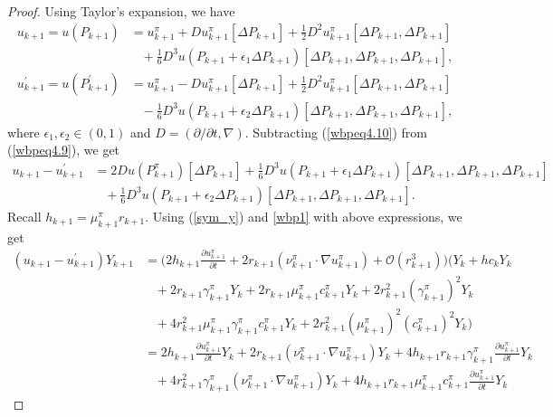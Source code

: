 \documentclass{article}
\theoremstyle{definition}
\numberwithin{equation}{section}
\begin{document}
\begin{proof}


 Using Taylor's expansion, we have
\begin{align}
    u_{k+1} = u(P_{k+1}) &= u^{\pi}_{k+1} + Du_{k+1}^{\pi}[\Delta P_{k+1}] + \frac{1}{2}D^{2}u_{k+1}^{\pi}[\Delta P_{k+1},\Delta P_{k+1} ] \nonumber \\ & \;\;\; +\frac{1}{6} D^{3}u(P_{k+1} + \epsilon_{1}\Delta P_{k+1})[\Delta P_{k+1},\Delta P_{k+1}, \Delta P_{k+1} ],\label{wbpeq4.9}\\ 
    u_{k+1}^{'} = u(P_{k+1}^{'}) &= u_{k+1}^{\pi} - Du_{k+1}^{\pi}[\Delta P_{k+1}]+  \frac{1}{2}D^{2}u_{k+1}^{\pi}[\Delta P_{k+1},\Delta P_{k+1} ] \nonumber \\ & \;\;\; - \frac{1}{6}D^{3}u(P_{k+1} + \epsilon_{2}\Delta P_{k+1})[\Delta P_{k+1},\Delta P_{k+1}, \Delta P_{k+1} ], \label{wbpeq4.10}
\end{align}
where $\epsilon_{1}, \epsilon_{2} \in (0,1)$ and $D = (\partial/\partial t, \nabla)$. Subtracting (\ref{wbpeq4.10}) from (\ref{wbpeq4.9}), we get
\begin{align}
u_{k+1} - u_{k+1}^{'} &= 2 Du(P_{k+1}^{\pi})[\Delta P_{k+1}]+\frac{1}{6} D^{3}u(P_{k+1} + \epsilon_{1}\Delta P_{k+1})[\Delta P_{k+1},\Delta P_{k+1}, \Delta P_{k+1}] \nonumber \\ & \;\;\; + \frac{1}{6}D^{3}u(P_{k+1} + \epsilon_{2}\Delta P_{k+1})[\Delta P_{k+1},\Delta P_{k+1}, \Delta P_{k+1} ].  
\end{align}
Recall $h_{k+1} = \mu_{k+1}^{\pi} r_{k+1} $. Using (\ref{sym_y}) and \eqref{wbp1} with above expressions, we get
\begin{align}
(u_{k+1} - u_{k+1}^{'})Y_{k+1} &= \Big(2 h_{k+1}\frac{\partial u_{k+1}^{\pi}}{\partial t} + 2r_{k+1}(\nu_{k+1}^{\pi} \cdot \nabla u_{k+1}^{\pi}) + \mathcal{O}(r_{k+1}^{3})\Big) \Big(Y_{k}+ hc_kY_k \nonumber \\ &  \;\;\; + 2r_{k+1}\gamma_{k+1}^{\pi}Y_{k}   + 2r_{k+1}\mu_{k+1}^{\pi}c^{\pi}_{k+1}Y_{k} + 2r_{k+1}^{2}(\gamma_{k+1}^{\pi})^{2}Y_{k}  \nonumber  \\& \;\;\; + 4r_{k+1}^{2}\mu_{k+1}^{\pi}\gamma_{k+1}^{\pi} c_{k+1}^{\pi}Y_{k} + 2r_{k+1}^{2}(\mu_{k+1}^{\pi})^{2}(c_{k+1}^{\pi})^{2}Y_{k} \Big)
\nonumber \\ &  
= 2h_{k+1}\frac{\partial u_{k+1}^{\pi}}{\partial t}Y_{k} + 2r_{k+1}(\nu_{k+1}^{\pi} \cdot \nabla u_{k+1}^{\pi})Y_{k} + 4h_{k+1}r_{k+1}\gamma_{k+1}^{\pi}\frac{\partial u_{k+1}^{\pi}}{\partial t}Y_{k} 
\nonumber \\ & \;\;\;
+ 4r_{k+1}^{2}\gamma_{k+1}^{\pi} (\nu_{k+1}^{\pi} \cdot \nabla  u_{k+1}^{\pi}) Y_{k}   + 4h_{k+1}r_{k+1}\mu_{k+1}^{\pi}c_{k+1}^{\pi}\frac{\partial u_{k+1}^{\pi}}{\partial t}Y_{k} 

\end{align}
\end{proof}
\end{document}
